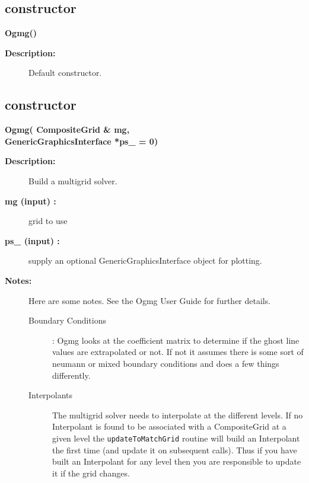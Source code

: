\subsection{constructor}
 
\newlength{\OgmgIncludeArgIndent}
\begin{flushleft} \textbf{%
\settowidth{\OgmgIncludeArgIndent}{Ogmg(}%
Ogmg()
}\end{flushleft}
\begin{description}
\item[{\bf Description:}] 
   Default constructor.
\end{description}
\subsection{constructor}
 
\begin{flushleft} \textbf{%
\settowidth{\OgmgIncludeArgIndent}{Ogmg(}%
Ogmg( CompositeGrid \& mg, \\ 
\hspace{\OgmgIncludeArgIndent}GenericGraphicsInterface *ps\_  = 0) 
}\end{flushleft}
\begin{description}
\item[{\bf Description:}] 
   
    Build a multigrid solver.
\item[{\bf mg (input) :}]  grid to use
\item[{\bf ps\_ (input) :}]  supply an optional GenericGraphicsInterface object for plotting.
\item[{\bf Notes:}]  
    Here are some notes. See the Ogmg User Guide for further details.
  \begin{description}
    \item[Boundary Conditions]: Ogmg looks at the coefficient matrix to determine if the ghost line
     values are extrapolated or not. If not it assumes there is some sort of neumann or mixed boundary
     conditions and does a few things differently.
    \item[Interpolants]  The multigrid solver needs to interpolate at the different levels.
      If no Interpolant is found to be associated with a CompositeGrid at a given level
      the {\tt updateToMatchGrid} routine will build an Interpolant the first time (and update it
      on subsequent calls). Thus if you have built an Interpolant for any level then you are responsible
      to update it if the grid changes.
  \end{description}
\end{description}

